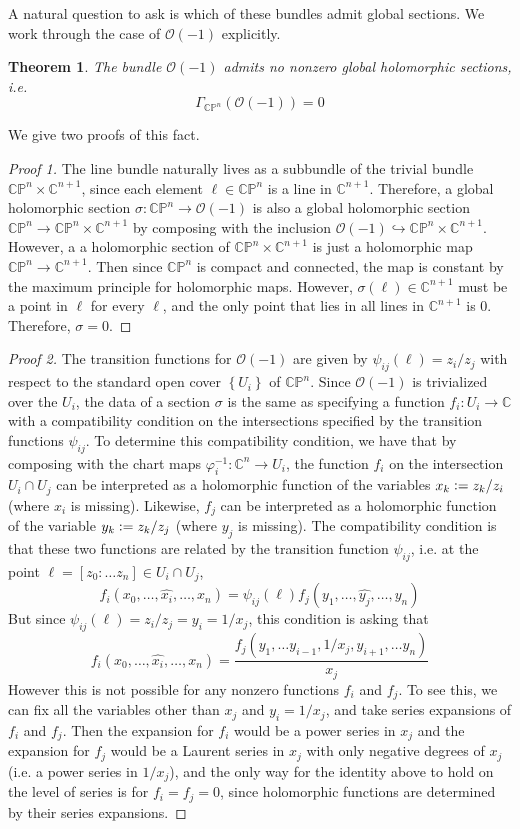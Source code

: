 \documentclass[psamsfonts, 12pt]{amsart}
\newtheorem{thm}{Theorem}[section]
\theoremstyle{definition}
\theoremstyle{remark}
\renewcommand{\O}{\mathcal{O}}
\newcommand{\C}{\mathbb{C}}
\newcommand{\CP}{\mathbb{CP}}
\newcommand{\inv}{^{-1}}
\newcommand{\set}[1]{\left\lbrace #1 \right\rbrace}
\newcommand{\defeq}{\vcentcolon=}
\begin{document}
A natural question to ask is which of these bundles admit global sections. We work
through the case of $\O(-1)$ explicitly.
%
\begin{thm}
The bundle $\O(-1)$ admits no nonzero global holomorphic sections, i.e.
\[
\Gamma_{\CP^n}(\O(-1)) = 0
\]
\end{thm}
%
We give two proofs of this fact.
%
\begin{proof}[Proof 1]
The line bundle naturally lives as a subbundle of the trivial bundle
$\CP^n \times \C^{n+1}$, since each element $\ell \in \CP^n$ is a line in
$\C^{n+1}$. Therefore, a global holomorphic section $\sigma : \CP^n \to \O(-1)$
is also a global holomorphic section $\CP^n \to \CP^n \times \C^{n+1}$ by composing
with the inclusion $\O(-1) \hookrightarrow \CP^n \times \C^{n+1}$. However,
a a holomorphic section of $\CP^n \times \C^{n+1}$ is just a holomorphic map
$\CP^n \to \C^{n+1}$. Then since $\CP^n$ is compact and connected, the map is constant by
the maximum principle for holomorphic maps. However, $\sigma(\ell) \in \C^{n+1}$ must
be a point in $\ell$ for every $\ell$, and the only point that lies in all lines
in $\C^{n+1}$ is $0$. Therefore, $\sigma = 0$.
\end{proof}
%
\begin{proof}[Proof 2]
The transition functions for $\O(-1)$ are given by $\psi_{ij}(\ell) = z_i/z_j$
with respect to the standard open cover $\set{U_i}$ of $\CP^n$. Since $\O(-1)$ is
trivialized over the $U_i$, the data of a section $\sigma$ is the same as specifying
a function $f_i : U_i \to \C$ with a compatibility condition on the intersections
specified by the transition functions $\psi_{ij}$. To determine this compatibility
condition, we have that by composing with the chart maps $\varphi_i\inv : \C^n \to U_i$,
the function $f_i$ on the intersection $U_i \cap U_j$ can be interpreted as
a holomorphic function of the variables $x_k \defeq z_k/z_i$ (where $x_i$ is missing).
Likewise, $f_j$ can be interpreted as a holomorphic function of the variable
$y_k \defeq z_k/z_j$ (where $y_j$ is missing). The compatibility condition is that these
two functions are related by the transition function $\psi_{ij}$, i.e. at the point
$\ell = [z_0: \ldots z_n] \in U_i \cap U_j$,
\[
f_i(x_0,\ldots,\widehat{x_i},\ldots, x_n) =
\psi_{ij}(\ell)f_j(y_1,\ldots, \widehat{y_j},\ldots, y_n)
\]
But since $\psi_{ij}(\ell) = z_i/z_j = y_i = 1/x_j$, this condition is asking that
\[
f_i(x_0,\ldots,\widehat{x_i},\ldots, x_n) =
\frac{f_j(y_1, \ldots y_{i-1}, 1/x_j, y_{i+1}, \ldots y_n)}{x_j}
\]
However this is not possible for any nonzero functions $f_i$ and $f_j$. To see
this, we can fix all the variables other than $x_j$ and $y_i = 1/x_j$, and take
series expansions of $f_i$ and $f_j$. Then the expansion for $f_i$ would be a power
series in $x_j$ and the expansion for $f_j$ would be a Laurent series in $x_j$ with
only negative degrees of $x_j$ (i.e. a power series in $1/x_j$), and the only way for
the identity above to hold on the level of series is for $f_i = f_j = 0$, since
holomorphic functions are determined by their series expansions.
\end{proof}
\end{document}
